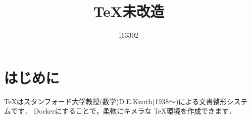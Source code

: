 \documentclass[10pt]{jarticle}
\title{\TeX 未改造}
\author{i13302}
\begin{document}
 
\maketitle 
\section{はじめに}
\TeX はスタンフォード大学教授(数学)D.E.Knuth(1938～)による文書整形システムです．
Dockerにすることで，柔軟にキメラな \TeX 環境を作成できます．
\end{document}
